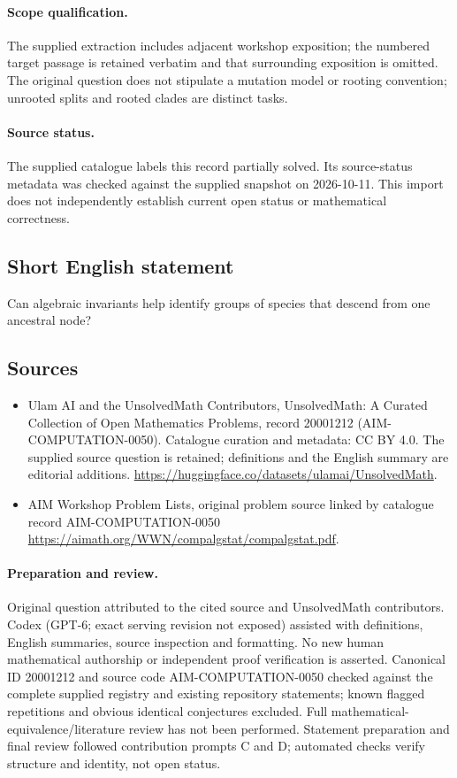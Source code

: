 \documentclass[11pt]{article}
\begin{document}
\paragraph{Scope qualification.}
The supplied extraction includes adjacent workshop exposition; the numbered target passage is retained verbatim and that surrounding exposition is omitted. The original question does not stipulate a mutation model or rooting convention; unrooted splits and rooted clades are distinct tasks.
\paragraph{Source status.}
The supplied catalogue labels this record partially solved. Its source-status metadata was checked against the supplied snapshot on 2026-10-11. This import does not independently establish current open status or mathematical correctness.
\subsection{Short English statement}
Can algebraic invariants help identify groups of species that descend from one ancestral node?
\subsection{Sources}
\begin{itemize}
\item[S1] Ulam AI and the UnsolvedMath Contributors, UnsolvedMath: A Curated Collection of Open Mathematics Problems, record 20001212 (AIM-COMPUTATION-0050). Catalogue curation and metadata: CC BY 4.0. The supplied source question is retained; definitions and the English summary are editorial additions.
\url{https://huggingface.co/datasets/ulamai/UnsolvedMath}.
\item[S2] AIM Workshop Problem Lists, original problem source linked by catalogue record AIM-COMPUTATION-0050
\url{https://aimath.org/WWN/compalgstat/compalgstat.pdf}.
\end{itemize}
\paragraph{Preparation and review.}
Original question attributed to the cited source and UnsolvedMath contributors. Codex (GPT-6; exact serving revision not exposed) assisted with definitions, English summaries, source inspection and formatting. No new human mathematical authorship or independent proof verification is asserted. Canonical ID 20001212 and source code AIM-COMPUTATION-0050 checked against the complete supplied registry and existing repository statements; known flagged repetitions and obvious identical conjectures excluded. Full mathematical-equivalence/literature review has not been performed. Statement preparation and final review followed contribution prompts C and D; automated checks verify structure and identity, not open status.
\label{end:20001212}
\end{document}
